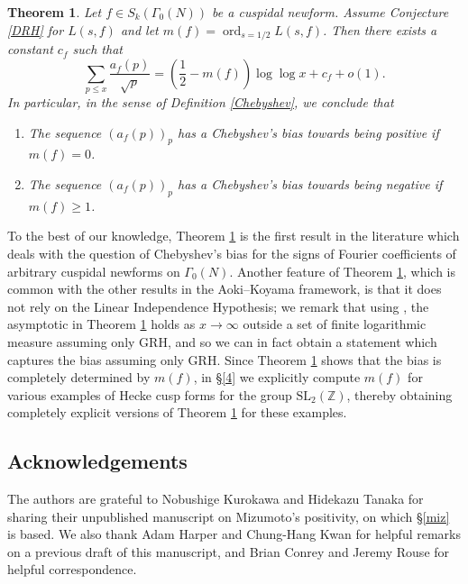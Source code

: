 \documentclass[12pt,reqno]{amsart}
\newtheorem{theorem}{Theorem}[section]
\theoremstyle{definition}
\numberwithin{equation}{section}
\newcommand{\SL}{\mathrm{SL}}
\newcommand{\ord}{\mathop{\mathrm{ord}}}
\begin{document}
\begin{theorem} \label{mainthm6}
Let $f \in S_k(\Gamma_0(N))$ be a cuspidal newform. 
Assume Conjecture \ref{DRH} for $L(s, f)$ and let $m(f)=\ord_{s=1/2} L(s, f)$.  Then there exists a constant $c_f$ such that 
$$
\sum_{p \leqslant x} \frac{a_f(p) }{\sqrt p} = \left( \frac{1}{2}- m(f) \right) \log \log x +c_f +o(1). 
$$
%
In particular, in the sense of Definition \ref{Chebyshev}, we conclude that 
\begin{enumerate}
 
\item The sequence $(a_f(p))_p$ has a Chebyshev's bias towards being positive if $m(f)=0$. 

\item The sequence $(a_f(p))_p$ has a Chebyshev's bias towards being negative if $m(f) \geq 1$.  
\end{enumerate}
\end{theorem}

To the best of our knowledge, Theorem \ref{mainthm6} is the first result in the literature which deals with the question of Chebyshev's bias for the signs of Fourier coefficients of arbitrary cuspidal newforms on $\Gamma_0(N)$. Another feature of Theorem \ref{mainthm6}, which is common with the other results in the Aoki--Koyama framework, is that it does not rely on the Linear Independence  Hypothesis;  %
we remark that using \cite[Theorem 4.1]{Sheth24B}, the asymptotic in Theorem \ref{mainthm6} holds as $x \to \infty$ outside a set of finite logarithmic measure assuming only GRH, and so we can in fact obtain a statement which captures the bias assuming only GRH.  
Since Theorem \ref{mainthm6} shows that the bias is completely determined by $m(f)$, in \S \ref{4} we explicitly compute $m(f)$ for various examples of Hecke cusp forms for the group $\SL_2(\mathbb Z)$, thereby obtaining completely explicit versions of Theorem \ref{mainthm6} for these examples. 
\subsection*{Acknowledgements}
The authors are grateful to Nobushige Kurokawa and Hidekazu Tanaka for sharing their unpublished  manuscript on Mizumoto's positivity, on which \S \ref{miz} is based. We also thank Adam Harper and Chung-Hang Kwan for helpful remarks on a previous draft of this manuscript, and Brian Conrey and Jeremy Rouse for helpful correspondence. 
\end{document}
